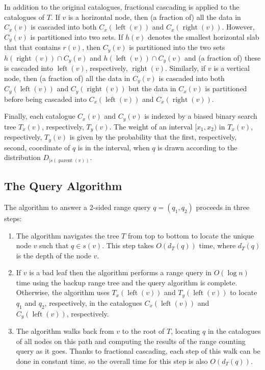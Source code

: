 \documentclass[lotsofwhite,charterfonts]{patmorin}
\DeclareMathOperator{\lft}{left}
\DeclareMathOperator{\rght}{right}
\DeclareMathOperator{\prnt}{parent}
\begin{document}
%

In addition to the original catalogues, fractional cascading is
applied to the catalogues of $T$.  If $v$ is a horizontal node, then
(a fraction of) all the data in $C_x(v)$ is cascaded into both
$C_x(\lft(v))$ and $C_x(\rght(v))$.  However, $C_y(v)$ is partitioned
into two sets.  If $h(v)$ denotes the smallest horizontal slab that
that contains $r(v)$, then $C_y(v)$ is partitioned into the two sets
$h(\rght(v))\cap C_y(v)$ and $h(\lft(v))\cap C_y(v)$ and (a fraction
of) these is cascaded into $\lft(v)$, respectively, $\rght(v)$.
Similarly, if $v$ is a vertical node, then (a fraction of) all the
data in $C_y(v)$ is cascaded into both $C_y(\lft(v))$ and
$C_y(\rght(v))$ but the data in $C_x(v)$ is partitioned before being
cascaded into $C_x(\lft(v))$ and $C_x(\rght(v))$.

Finally, each catalogue $C_x(v)$ and $C_y(v)$ is indexed by a biased
binary search tree $T_x(v)$, respectively, $T_y(v)$.  The weight of an
interval $[x_1,x_2)$ in $T_x(v)$, respectively, $T_y(v)$ is given by
the probability that the first, respectively, second, coordinate of
$q$ is in the interval, when $q$ is drawn according to the
distribution $D_{\mid s(\prnt(v))}$.


\subsection{The Query Algorithm}

The algorithm to answer a 2-sided range query $q=(q_1,q_2)$ proceeds
in three steps:

\begin{enumerate}

\item The algorithm navigates the tree $T$ from top to bottom to
locate the unique node $v$ such that $q\in s(v)$. This step
takes $O(d_T(q))$ time, where $d_T(q)$ is the depth of the node $v$.

\item If $v$ is a bad leaf then the algorithm performs a range query
in $O(\log n)$ time using the backup range tree and the query
algorithm is complete.  Otherwise, the algorithm uses $T_x(\lft(v))$ and
$T_y(\lft(v))$ to locate $q_1$ and $q_2$, respectively, in the catalogues
$C_x(\lft(v))$ and $C_y(\lft(v))$, respectively.

\item The algorithm walks back from $v$ to the root of $T$, locating
$q$ in the catalogues of all nodes on this path and computing the
results of the range counting query as it goes.  Thanks to fractional
cascading, each step of this walk can be done in constant time, so the
overall time for this step is also $O(d_T(q))$.
\end{enumerate}
\end{document}
